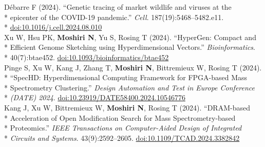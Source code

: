 \documentclass[margin,line]{res}
\begin{document}
\begin{resume}
\hspace*{9.5mm} D\'{e}barre F (2024). ``Genetic tracing of market wildlife and viruses at the\\*
\hspace*{9.5mm} epicenter of the COVID-19 pandemic.'' \textit{Cell}. 187(19):5468--5482.e11.\\*\vspace{2mm}
\hspace*{8mm} \href{https://doi.org/10.1016/j.cell.2024.08.010}{doi:10.1016/j.cell.2024.08.010}\\
\hspace*{4mm} Xu W, Hsu PK, \textbf{Moshiri N}, Yu S, Rosing T (2024). ``HyperGen: Compact and\\*
\hspace*{9.5mm} Efficient Genome Sketching using Hyperdimensional Vectors.'' \textit{Bioinformatics}.\\*\vspace{2mm}
\hspace*{8mm} 40(7):btae452. \href{https://doi.org/10.1093/bioinformatics/btae452}{doi:10.1093/bioinformatics/btae452}\\
\hspace*{4mm} Pinge S, Xu W, Kang J, Zhang T, \textbf{Moshiri N}, Bittremieux W, Rosing T (2024).\\*
\hspace*{9.5mm} ``SpecHD: Hyperdimensional Computing Framework for FPGA-based Mass\\*
\hspace*{9.5mm} Spectrometry Clustering.'' \textit{Design Automation and Test in Europe Conference}\\*\vspace{2mm}
\hspace*{8mm} \textit{(DATE) 2024}. \href{https://doi.org/10.23919/DATE58400.2024.10546776}{doi:10.23919/DATE58400.2024.10546776}\\
\hspace*{4mm} Kang J, Xu W, Bittremieux W, \textbf{Moshiri N}, Rosing T (2024). ``DRAM-based\\*
\hspace*{9.5mm} Acceleration of Open Modification Search for Mass Spectrometry-based\\*
\hspace*{9.5mm} Proteomics.'' \textit{IEEE Transactions on Computer-Aided Design of Integrated}\\*\vspace{2mm}
\hspace*{8mm} \textit{Circuits and Systems}. 43(9):2592--2605. \href{https://doi.org/10.1109/TCAD.2024.3382842}{doi:10.1109/TCAD.2024.3382842}\\

\end{resume}
\end{document}
